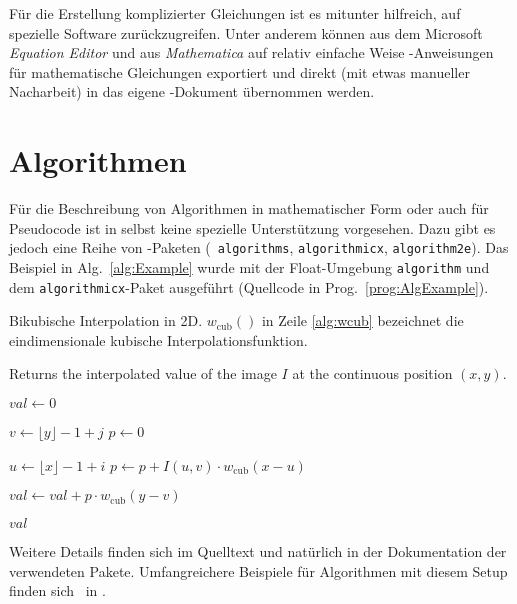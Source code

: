 Für die Erstellung komplizierter Gleichungen ist es mitunter
hilfreich, auf spezielle Software zurückzugreifen. Unter anderem können
aus dem Microsoft \emph{Equation Editor} und aus {\em
Mathematica} auf relativ einfache Weise \latex-An\-wei\-sun\-gen
für mathematische Gleichungen exportiert und direkt (mit etwas
manueller Nacharbeit) in das eigene \latex-Dokument übernommen werden.


\section{Algorithmen}

Für die Beschreibung von Algorithmen in mathematischer Form oder auch für
Pseudo\-code ist in \latex selbst keine spezielle Unterstützung vorgesehen.
Dazu gibt es jedoch eine Reihe von \latex-Paketen (\zB\ \texttt{algorithms}, 
\texttt{algorithmicx}, \texttt{algorithm2e}).
Das Beispiel in Alg.~\ref{alg:Example} wurde mit der Float-Umgebung \texttt{algorithm} 
und dem \texttt{algorithmicx}-Paket ausgeführt
(Quellcode in Prog.~\ref{prog:AlgExample}).

\begin{algorithm}[tbp]
\caption{Bikubische Interpolation in 2D.
	$w_{\mathrm{cub}}()$ in Zeile \ref{alg:wcub} bezeichnet die 
	eindimensionale kubische Interpolationsfunktion.}
\label{alg:Example}

\begin{algorithmic}[1]     %
 
	\Statex Returns the interpolated value of the image $I$ 
					at the continuous position $(x, y)$.
	
	\State $\mathit{val} \gets 0$
	
	 
		\State $v \gets \lfloor y \rfloor - 1 + j$
		\State $p \gets 0$
		
		 
			\State $u \gets \lfloor x \rfloor - 1 + i$
			\State $p \gets p + I(u,v) \cdot w_{\mathrm{cub}}(x - u )$
					\label{alg:wcub}
		\EndFor
		
		\State $\mathit{val} \gets \mathit{val} + p \cdot w_{\mathrm{cub}}(y - v)$
	\EndFor
	
	\State\Return $\mathit{val}$
	
\EndProcedure
\end{algorithmic}
\end{algorithm}

Weitere Details finden sich im Quelltext und natürlich in der Dokumentation der verwendeten Pakete.
Umfangreichere Beispiele für Algorithmen mit diesem Setup finden sich \ua\ in \cite{BurgerBurge06}.


